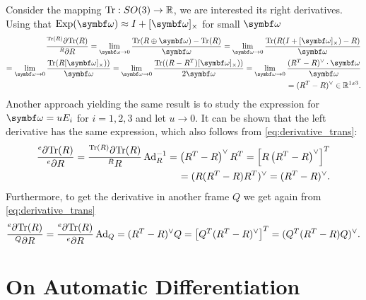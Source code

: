 \begin{tcolorbox}[title=Example: trace on SO(3)]
  Consider the mapping $\mathrm{Tr} : SO(3) \rightarrow \mathbb{R}$, we are interested its right derivatives. Using that $\Exp(\bomega) \approx I + [\bomega]_\times$ for small $\bomega$
  \begin{equation}
    \begin{aligned}
      \frac{^{\tr(R)}\partial \tr(R)}{^R\partial R} = \lim_{\bomega \rightarrow 0} \frac{\tr(R \oplus \bomega) - \tr(R)}{\bomega} =  \lim_{\bomega \rightarrow 0} \frac{\tr(R (I + [\bomega]_\times) - R) }{\bomega}                                \\
      = \lim_{\bomega \rightarrow 0} \frac{\tr(R [\bomega]_\times )) }{\bomega} = \lim_{\bomega \rightarrow 0} \frac{\tr((R - R^T) [\bomega]_\times )) }{2 \bomega} =  \lim_{\bomega \rightarrow 0} \frac{ (R^T - R)^\vee \cdot \bomega  }{\bomega} \\
      = (R^T - R)^\vee \in \mathbb{R}^{1 x 3}.
    \end{aligned}
  \end{equation}
  Another approach yielding the same result is to study the expression for $\bomega = u E_i$ for $i=1,2,3$ and let $u \rightarrow 0$.	It can be shown that the left derivative has the same expression, which also follows from \eqref{eq:derivative_trans}:
  \begin{equation}
    \label{eq:dtr_dr}
    \begin{aligned}
      \frac{^e\partial \mathrm{Tr}(R)}{^e \partial R} = \frac{^{\mathrm{Tr}(R)}\partial \mathrm{Tr}(R)}{^RR} \operatorname{Ad}_R^{-1} = \left(R^T - R\right)^\vee R^T  =  \left[ R \left( R^T - R \right)^\vee  \right]^T \\
      = (R (R^T - R) R^T)^\vee = (R^T - R)^\vee.
    \end{aligned}
  \end{equation}
  Furthermore, to get the derivative in another frame $Q$ we get again from \eqref{eq:derivative_trans}
  \begin{equation}
    \begin{aligned}
      \frac{^e\partial \mathrm{Tr}(R)}{^Q \partial R} =  \frac{^e\partial \mathrm{Tr}(R)}{^e \partial R} \operatorname{Ad}_{Q} = (R^T - R)^\vee Q
      = \left[ Q^T (R^T - R)^\vee \right]^T
      = (Q^T (R^T - R) Q)^\vee.
    \end{aligned}
  \end{equation}
\end{tcolorbox}


\section{On Automatic Differentiation}

